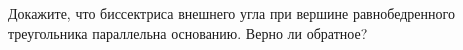 \begin{ex}
	\begin{condition}
		Докажите, что биссектриса внешнего угла при вершине равнобедренного треугольника параллельна основанию.	Верно ли обратное?
	\end{condition}
\end{ex}
